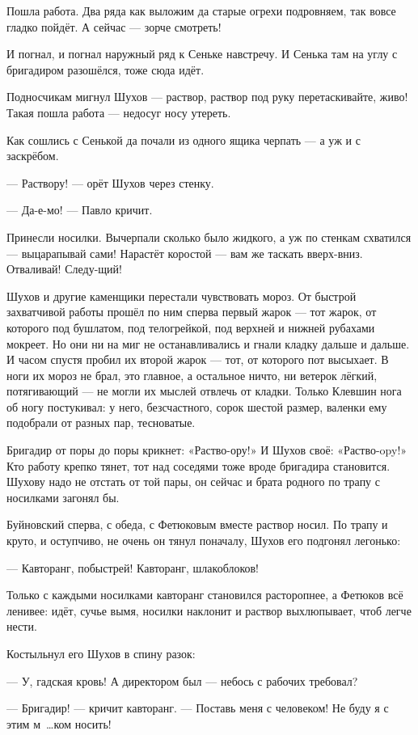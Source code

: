 Пошла работа. Два ряда как выложим да старые огрехи подровняем, так вовсе гладко пойдёт. А сейчас --- зорче смотреть!

И погнал, и погнал наружный ряд к Сеньке навстречу. И Сенька там на углу с бригадиром разошёлся, тоже сюда идёт.

Подносчикам мигнул Шухов --- раствор, раствор под руку перетаскивайте, живо! Такая пошла работа --- недосуг носу утереть.

Как сошлись с Сенькой да почали из одного ящика черпать --- а уж и с заскрёбом.

--- Раствору! --- орёт Шухов через стенку.

--- Да-е-мо! --- Павло кричит.

Принесли носилки. Вычерпали сколько было жидкого, а уж по стенкам схватился --- выцарапывай сами! Нарастёт коростой --- вам же таскать вверх-вниз. Отваливай! Следу-щий!

Шухов и другие каменщики перестали чувствовать мороз. От быстрой захватчивой работы прошёл по ним сперва первый жарок --- тот жарок, от которого под бушлатом, под телогрейкой, под верхней и нижней рубахами мокреет. Но они ни на миг не останавливались и гнали кладку дальше и дальше. И часом спустя пробил их второй жарок --- тот, от которого пот высыхает. В ноги их мороз не брал, это главное, а остальное ничто, ни ветерок лёгкий, потягивающий --- не могли их мыслей отвлечь от кладки. Только Клевшин нога об ногу постукивал: у него, безсчастного, сорок шестой размер, валенки ему подобрали от разных пар, тесноватые.

Бригадир от поры до поры крикнет: «Раство-ору!» И Шухов своё: «Раство-opy!» Кто работу крепко тянет, тот над соседями тоже вроде бригадира становится. Шухову надо не отстать от той пары, он сейчас и брата родного по трапу с носилками загонял бы.

Буйновский сперва, с обеда, с Фетюковым вместе раствор носил. По трапу и круто, и оступчиво, не очень он тянул поначалу, Шухов его подгонял легонько:

--- Кавторанг, побыстрей! Кавторанг, шлакоблоков!

Только с каждыми носилками кавторанг становился расторопнее, а Фетюков всё ленивее: идёт, сучье вымя, носилки наклонит и раствор выхлюпывает, чтоб легче нести.

Костыльнул его Шухов в спину разок:

--- У, гадская кровь! А директором был --- небось с рабочих требовал?

--- Бригадир! --- кричит кавторанг. --- Поставь меня с человеком! Не буду я с этим м~\dots{}ком носить!

